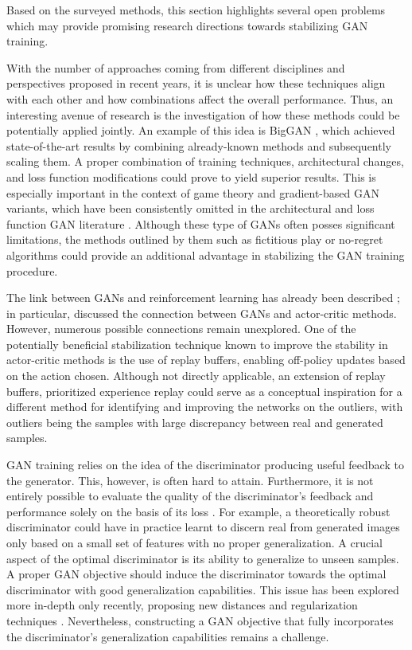 \label{sec:openprob}
Based on the surveyed methods, this section highlights several open problems which may provide promising research directions towards stabilizing GAN training.

With the number of approaches coming from different disciplines and perspectives proposed in recent years, it is unclear how these techniques align with each other and how combinations affect the overall performance. Thus, an interesting avenue of research is the investigation of how these methods could be potentially applied jointly. An example of this idea is BigGAN , which achieved state-of-the-art results by combining already-known methods and subsequently scaling them. A proper combination of training techniques, architectural changes, and loss function modifications could prove to yield superior results. This is especially important in the context of game theory and gradient-based GAN variants, which have been consistently omitted in the architectural and loss function GAN literature . Although these type of GANs often posses significant limitations, the methods outlined by them such as fictitious play or no-regret algorithms could provide an additional advantage in stabilizing the GAN training procedure.

The link between GANs and reinforcement learning has already been described ; in particular,  discussed the connection between GANs and actor-critic methods. However, numerous possible connections remain unexplored. One of the potentially beneficial stabilization technique known to improve the stability in actor-critic methods is the use of replay buffers, enabling off-policy updates based on the action chosen. Although not directly applicable, an extension of replay buffers, prioritized experience replay  could serve as a conceptual inspiration for a different method for identifying and improving the networks on the outliers, with outliers being the samples with large discrepancy between real and generated samples.

GAN training relies on the idea of the discriminator producing useful feedback to the generator. This, however, is often hard to attain. Furthermore, it is not entirely possible to evaluate the quality of the discriminator's feedback and performance solely on the basis of its loss . For example, a theoretically robust discriminator could have in practice learnt to discern real from generated images only based on a small set of features with no proper generalization. A crucial aspect of the optimal discriminator is its ability to generalize to unseen samples. A proper GAN objective should induce the discriminator towards the optimal discriminator with good generalization capabilities. This issue has been explored more in-depth only recently, proposing new distances  and regularization techniques . Nevertheless, constructing a GAN objective that fully incorporates the discriminator's generalization capabilities remains a challenge.

